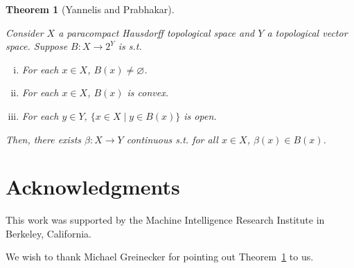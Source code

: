 \documentclass[11pt]{article}
\theoremstyle{definition}
\theoremstyle{plain}
\newtheorem{theorem}{Theorem}%
\begin{document}
\begin{samepage}
\begin{theorem} [Yannelis and Prabhakar]
\label{thm:selection}

Consider $X$ a paracompact Hausdorff topological space and $Y$ a topological vector space. Suppose $B: X \rightarrow 2^Y$ is s.t.

\begin{enumerate}[i.]

\item For each $x \in X$, $B\left(x\right) \ne \varnothing$.
\item For each $x \in X$, $B\left(x\right)$ is convex.
\item For each $y \in Y$, $\{x \in X \mid y \in B\left(x\right)\}$ is open.

\end{enumerate}

Then, there exists $\beta: X \rightarrow Y$ continuous s.t. for all $x \in X$, $\beta\left(x\right) \in B\left(x\right)$.

\end{theorem}
\end{samepage}

\section*{Acknowledgments}

This work was supported by the Machine Intelligence Research Institute in Berkeley, California.

We wish to thank Michael Greinecker for pointing out Theorem~\ref{thm:selection} to us.



\end{document}

